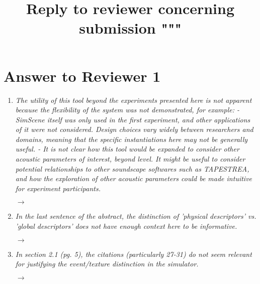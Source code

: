 \documentclass[10pt]{article}
\title{Reply to reviewer concerning submission """}
\begin{document}
\maketitle

\section{Answer to Reviewer 1}

\begin{enumerate}

\item \emph{The utility of this tool beyond the experiments presented here is not apparent because the flexibility of the system was not demonstrated, for example:
- SimScene itself was only used in the first experiment, and other applications of it were not considered. Design choices vary widely between researchers and domains, meaning that the specific instantiations here may not be generally useful.
- It is not clear how this tool would be expanded to consider other acoustic parameters of interest, beyond level. It might be useful to consider potential relationships to other soundscape softwares such as TAPESTREA, and how the exploration of other acoustic parameters could be made intuitive for experiment participants.}

$\rightarrow$

\item \emph{In the last sentence of the abstract, the distinction of 'physical descriptors' vs. 'global descriptors'  does not have enough context here to be informative.}

$\rightarrow$

\item \emph{In section 2.1 (pg. 5), the citations (particularly 27-31) do not seem relevant for justifying the event/texture distinction in the simulator.}

$\rightarrow$

\end{enumerate}
\end{document}
